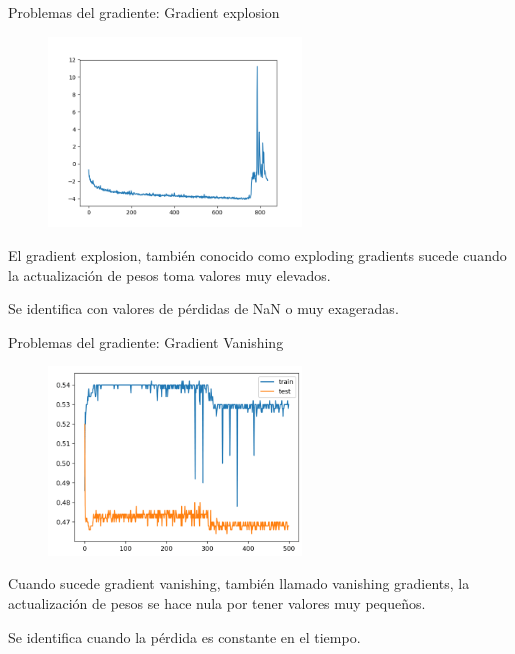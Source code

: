 \begin{frame}{Problemas del gradiente: Gradient explosion}
\begin{figure}
    \centering
    \includegraphics[width=0.6\textwidth]{Slides/figures/Tema 3/GradientExplosion.png}
    \caption{\cite{GradienExplosion}}
\end{figure}

El \alert{gradient explosion}, también conocido como \alert{exploding gradients} sucede cuando la actualización de pesos toma valores \alert{muy elevados}.

Se identifica con valores de pérdidas de \alert{NaN o muy exageradas}.
\end{frame}

\begin{frame}{Problemas del gradiente: Gradient Vanishing}
\begin{figure}
    \centering
    \includegraphics[width=0.6\textwidth]{Slides/figures/Tema 3/GradientVanishing.png}
    \caption{\cite{GradienVanishing}}
\end{figure}

Cuando sucede \alert{gradient vanishing}, también llamado \alert{vanishing gradients}, la actualización de pesos se hace \alert{nula} por tener valores \alert{muy pequeños}.

Se identifica cuando la pérdida es \alert{constante en el tiempo}.
\end{frame}


